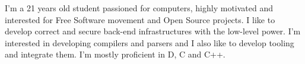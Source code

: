 

\begin{cvparagraph}

I'm a 21 years old student passioned for computers, highly motivated and
	interested for Free Software movement and Open Source projects. I like
	to develop correct and secure back-end infrastructures with the
	low-level power. I'm interested in developing compilers and parsers and
	I also like to develop tooling and integrate them. I'm mostly
	proficient in D, C and C++.

\end{cvparagraph}
